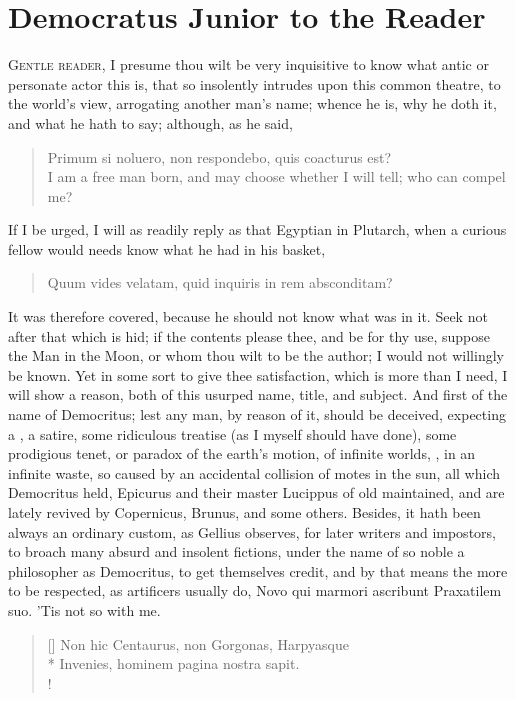 \chapter{Democratus Junior to the Reader}
{
  \lettrine[lines=3]{G}{entle reader}, I presume thou wilt be very inquisitive to know what
antic or personate actor this is, that so insolently intrudes upon this
common theatre, to the world's view, arrogating another man's name;
whence he is, why he doth it, and what he hath to say; although, as
he said,

\begin{quote}
\textlatin{Primum si noluero, non respondebo, quis coacturus est?}\\
I am a free man born, and may choose whether I will tell; who can compel me?
\end{quote}
If I be urged, I will as readily reply as that Egyptian in Plutarch,
when a curious fellow would needs know what he had in his basket,
\begin{quote}
\textlatin{Quum vides velatam, quid inquiris in rem absconditam?}
\end{quote}
It was therefore covered, because he should not know what was in it. Seek not after that
which is hid; if the contents please thee, and be for thy use,
suppose the Man in the Moon, or whom thou wilt to be the author; I
would not willingly be known. Yet in some sort to give thee
satisfaction, which is more than I need, I will show a reason, both of
this usurped name, title, and subject. And first of the name of
Democritus; lest any man, by reason of it, should be deceived,
expecting a , a satire, some ridiculous treatise (as I myself
should have done), some prodigious tenet, or paradox of the earth's
motion, of infinite worlds, , in an infinite waste, so caused by an accidental collision
of motes in the sun, all which Democritus held, Epicurus and their
master Lucippus of old maintained, and are lately revived by
Copernicus, Brunus, and some others. Besides, it hath been always an
ordinary custom, as Gellius observes, for later writers and
impostors, to broach many absurd and insolent fictions, under the name
of so noble a philosopher as Democritus, to get themselves credit, and
by that means the more to be respected, as artificers usually do,
\textlatin{Novo qui marmori ascribunt Praxatilem suo}. 'Tis not so with me.
\settowidth{\versewidth}{Non hic Centaurus, non Gorgonas, Harpyasque}
\begin{verse}[\versewidth]
\textlatin{Non hic Centaurus, non Gorgonas, Harpyasque}\\*
\textlatin{Invenies, hominem pagina nostra sapit.}\\!


\end{verse}}
